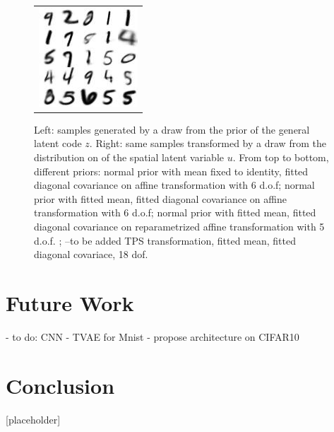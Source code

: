 \documentclass[letterpaper, twoside]{article}
\begin{document}
\begin{figure}[h]
\begin{minipage}{.5\textwidth}
\begin{tabular}{|@{}c@{}|}
\includegraphics[scale=1]{manifold_sig_52.jpg}\\
\end{tabular}
\end{minipage}%
\caption{Left: samples generated by a draw from the prior of the general latent code $z$. Right: same samples transformed by a draw from the distribution on of the spatial latent variable $u$. From top to bottom, different priors: normal prior with mean fixed to identity, fitted diagonal covariance on affine transformation with 6 d.o.f; normal prior with fitted mean, fitted diagonal covariance on affine transformation with 6 d.o.f; normal prior with fitted mean, fitted diagonal covariance on reparametrized affine transformation with 5 d.o.f. ; --to be added TPS transformation, fitted mean, fitted diagonal covariace, 18 dof.}
\label{generatedwithpose}
\end{figure}

\section{Future Work}

- to do: CNN - TVAE for Mnist
- propose architecture on CIFAR10

\section{Conclusion}
[placeholder]


\end{document}
